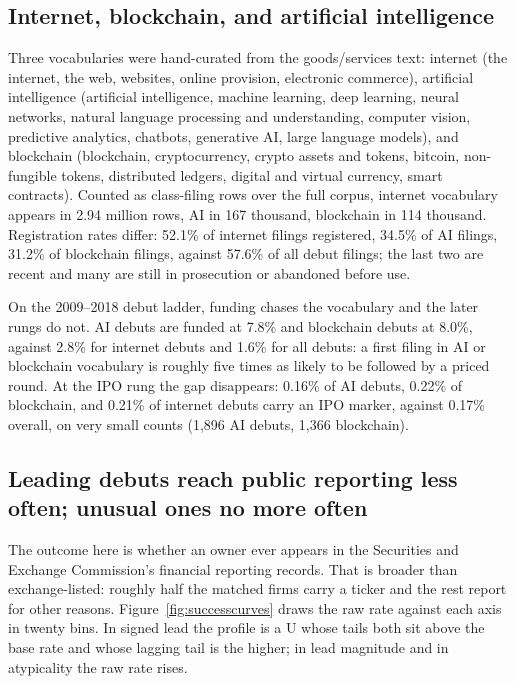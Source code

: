 \subsection{Internet, blockchain, and artificial intelligence}\label{sec:curated}

Three vocabularies were hand-curated from the goods/services text:
internet (the internet, the web, websites, online provision, electronic
commerce), artificial intelligence (artificial intelligence, machine
learning, deep learning, neural networks, natural language processing and
understanding, computer vision, predictive analytics, chatbots, generative
AI, large language models), and blockchain (blockchain, cryptocurrency,
crypto assets and tokens, bitcoin, non-fungible tokens, distributed
ledgers, digital and virtual currency, smart contracts). Counted as
class-filing rows over the full corpus, internet vocabulary appears in
2.94 million rows, AI in 167 thousand, blockchain in 114 thousand.
Registration rates differ: 52.1\% of internet filings registered, 34.5\%
of AI filings, 31.2\% of blockchain filings, against 57.6\% of all debut
filings; the last two are recent and many are still in prosecution or
abandoned before use.

On the 2009--2018 debut ladder, funding chases the vocabulary and the
later rungs do not. AI debuts are funded at 7.8\% and blockchain debuts
at 8.0\%, against 2.8\% for internet debuts and 1.6\% for all debuts: a
first filing in AI or blockchain vocabulary is roughly five times as
likely to be followed by a priced round. At the IPO rung the gap
disappears: 0.16\% of AI debuts, 0.22\% of blockchain, and 0.21\% of
internet debuts carry an IPO marker, against 0.17\% overall, on very
small counts (1{,}896 AI debuts, 1{,}366 blockchain).

\subsection{Leading debuts reach public reporting less often; unusual ones no more often}\label{sec:bluesea}

The outcome here is whether an owner ever appears in the Securities and
Exchange Commission's financial reporting records. That is broader than
exchange-listed: roughly half the matched firms carry a ticker and the
rest report for other reasons. Figure~\ref{fig:successcurves} draws the
raw rate against each axis in twenty bins. In signed lead the profile is a
U whose tails both sit above the base rate and whose lagging tail is the
higher; in lead magnitude and in atypicality the raw rate rises.

